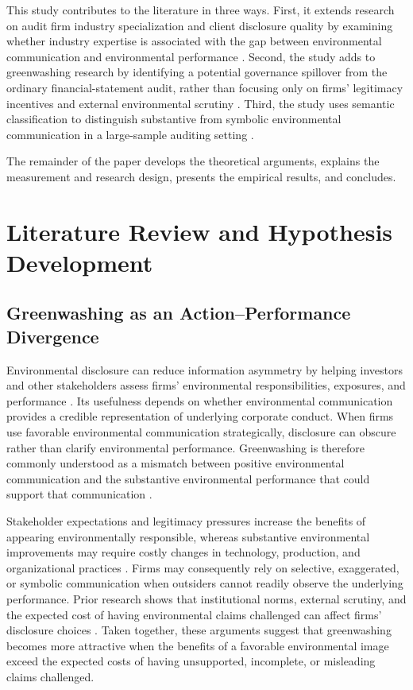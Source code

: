 \documentclass[11pt]{article}
\begin{document}
This study contributes to the literature in three ways.
First, it extends research on audit firm industry specialization and client disclosure quality by examining whether industry expertise is associated with the gap between environmental communication and environmental performance \citep{balsam2003auditor,dunn2004audit,reichelt2010national}.
Second, the study adds to greenwashing research by identifying a potential governance spillover from the ordinary financial-statement audit, rather than focusing only on firms' legitimacy incentives and external environmental scrutiny \citep{delmas2011drivers,lyon2011greenwash,marquis2016scrutiny}.
Third, the study uses semantic classification to distinguish substantive from symbolic environmental communication in a large-sample auditing setting \citep{baier2020textual,bilinski2024usefulness,xu2026deepgreen}.

The remainder of the paper develops the theoretical arguments, explains the measurement and research design, presents the empirical results, and concludes.

\section{Literature Review and Hypothesis Development}

\subsection{Greenwashing as an Action--Performance Divergence}

Environmental disclosure can reduce information asymmetry by helping investors and other stakeholders assess firms' environmental responsibilities, exposures, and performance \citep{healy2001information,verrecchia2001essays}.
Its usefulness depends on whether environmental communication provides a credible representation of underlying corporate conduct.
When firms use favorable environmental communication strategically, disclosure can obscure rather than clarify environmental performance.
Greenwashing is therefore commonly understood as a mismatch between positive environmental communication and the substantive environmental performance that could support that communication \citep{delmas2011drivers,lyon2011greenwash}.

Stakeholder expectations and legitimacy pressures increase the benefits of appearing environmentally responsible, whereas substantive environmental improvements may require costly changes in technology, production, and organizational practices \citep{delmas2011drivers}.
Firms may consequently rely on selective, exaggerated, or symbolic communication when outsiders cannot readily observe the underlying performance.
Prior research shows that institutional norms, external scrutiny, and the expected cost of having environmental claims challenged can affect firms' disclosure choices \citep{kim2015greenwash,marquis2016scrutiny,lyon2011greenwash}.
Taken together, these arguments suggest that greenwashing becomes more attractive when the benefits of a favorable environmental image exceed the expected costs of having unsupported, incomplete, or misleading claims challenged.
\end{document}
